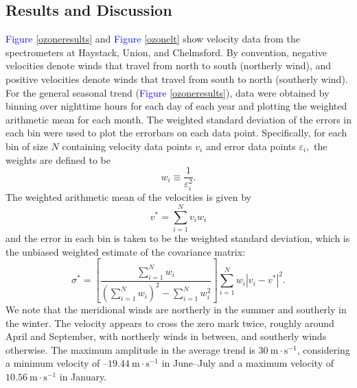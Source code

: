 \documentclass[11pt]{article}
\begin{document}
\subsection{Results and Discussion}
\textcolor{blue}{Figure} \ref{ozoneresults} and \textcolor{blue}{Figure} \ref{ozonelt} show velocity data from the spectrometers at Haystack, Union, and Chelmsford. By convention, negative velocities denote winds that travel from north to south (northerly wind), and positive velocities denote winds that travel from south to north (southerly wind). For the general seasonal trend (\textcolor{blue}{Figure} \ref{ozoneresults}), data were obtained by binning over nighttime hours for each day of each year and plotting the weighted arithmetic mean for each month. The weighted standard deviation of the errors in each bin were used to plot the errorbars on each data point. Specifically, for each bin of size $N$ containing velocity data points $v_i$ and error data points $\varepsilon_i,$ the weights are defined to be
	\begin{equation}
		w_i \equiv \frac{1}{\varepsilon_i^2}.
	\end{equation}
The weighted arithmetic mean of the velocities is given by
	\begin{equation}
		v^* = \sum_{i=1}^N v_iw_i
	\end{equation}
and the error in each bin is taken to be the weighted standard deviation, which is the unbiased weighted estimate of the covariance matrix:
	\begin{equation}
		\sigma^* = \left[\frac{\displaystyle\sum_{i=1}^N w_i}{\left(\displaystyle\sum_{i=1}^N w_i\right)^2-\displaystyle\sum_{i=1}^N w_i^2}\right]\displaystyle\sum_{i=1}^N w_i |v_i-v^*|^2.
	\end{equation}
We note that the meridional winds are northerly in the summer and southerly in the winter. The velocity appears to cross the zero mark twice, roughly around April and September, with northerly winds in between, and southerly winds otherwise. The maximum amplitude in the average trend is $30~\text{m}\cdot\text{s}^{-1}$, considering a minimum velocity of --$19.44~\text{m}\cdot\text{s}^{-1}$ in June--July and a maximum velocity of $10.56~\text{m}\cdot\text{s}^{-1}$ in January.
\end{document}
